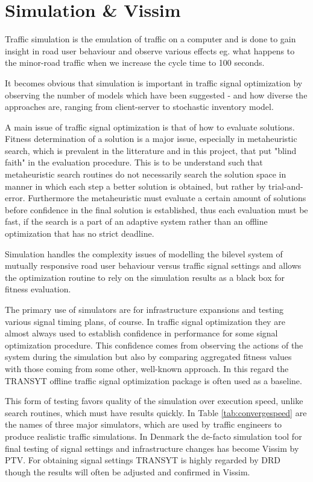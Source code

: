 \section{Simulation \& Vissim}
\label{simulation}
Traffic simulation is the emulation of traffic on a computer and is done to gain insight in road user behaviour and observe various effects eg. what happens to the minor-road traffic when we increase the cycle time to 100 seconds.

It becomes obvious that simulation is important in traffic signal optimization by observing the number of models which have been suggested - and how diverse the approaches are, ranging from client-server to stochastic inventory model.

A main issue of traffic signal optimization is that of how to evaluate solutions. Fitness determination of a solution is a major issue, especially in metaheuristic search, which is prevalent in the litterature and in this project, that put "blind faith" in the evaluation procedure. This is to be understand such that metaheuristic search routines do not necessarily search the solution space in manner in which each step a better solution is obtained, but rather by trial-and-error. 
Furthermore the metaheuristic must evaluate a certain amount of solutions before confidence in the final solution is established, thus each evaluation must be fast, if the search is a part of an adaptive system rather than an offline optimization that has no strict deadline.

Simulation handles the complexity issues of modelling the bilevel system of mutually responsive road user behaviour versus traffic signal settings and allows the optimization routine to rely on the simulation results as a black box for fitness evaluation. 

The primary use of simulators are for infrastructure expansions and testing various signal timing plans, of course. In traffic signal optimization they are almost always used to establish confidence in performance for some signal optimization procedure. This confidence comes from observing the actions of the system during the simulation but also by comparing aggregated fitness values with those coming from some other, well-known approach. In this regard the TRANSYT offline traffic signal optimization package is often used as a baseline. 

This form of testing favors quality of the simulation over execution speed, unlike search routines, which must have results quickly. 
In Table \ref{tab:convergespeed} are the names of three major simulators, which are used by traffic engineers to produce realistic traffic simulations. 
In Denmark the de-facto simulation tool for final testing of signal settings and infrastructure changes has become Vissim by PTV. For obtaining signal settings TRANSYT is highly regarded by DRD though the results will often be adjusted and confirmed in Vissim.


